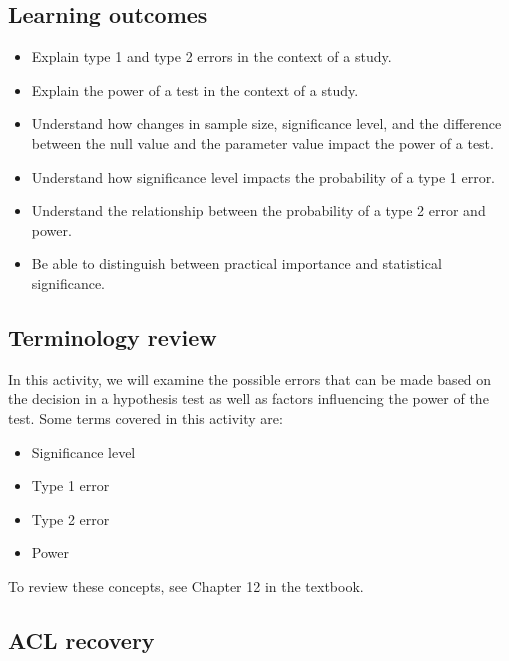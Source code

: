 \documentclass[
]{report}
\begin{document}

\hypertarget{learning-outcomes-13}{%
\subsection{Learning outcomes}\label{learning-outcomes-13}}

\begin{itemize}
\item
  Explain type 1 and type 2 errors in the context of a study.
\item
  Explain the power of a test in the context of a study.
\item
  Understand how changes in sample size, significance level, and the difference between the null value and the parameter value impact the power of a test.
\item
  Understand how significance level impacts the probability of a type 1 error.
\item
  Understand the relationship between the probability of a type 2 error and power.
\item
  Be able to distinguish between practical importance and statistical significance.
\end{itemize}

\hypertarget{terminology-review-12}{%
\subsection{Terminology review}\label{terminology-review-12}}

In this activity, we will examine the possible errors that can be made based on the decision in a hypothesis test as well as factors influencing the power of the test. Some terms covered in this activity are:

\begin{itemize}
\item
  Significance level
\item
  Type 1 error
\item
  Type 2 error
\item
  Power
\end{itemize}

To review these concepts, see Chapter 12 in the textbook.

\hypertarget{acl-recovery}{%
\subsection{ACL recovery}\label{acl-recovery}}
\end{document}
